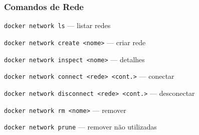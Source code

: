 \begin{frame}
  \frametitle{Comandos de Rede}
  \small
  \texttt{docker network ls} \hspace{4em} — listar redes

  \vspace{0.2em}
  \texttt{docker network create <nome>} \hspace{0.5em} — criar rede

  \vspace{0.2em}
  \texttt{docker network inspect <nome>} — detalhes

  \vspace{0.2em}
  \texttt{docker network connect <rede> <cont.>} — conectar

  \vspace{0.2em}
  \texttt{docker network disconnect <rede> <cont.>} — desconectar

  \vspace{0.2em}
  \texttt{docker network rm <nome>} \hspace{1.5em} — remover

  \vspace{0.2em}
  \texttt{docker network prune} \hspace{3em} — remover não utilizadas
\end{frame}
